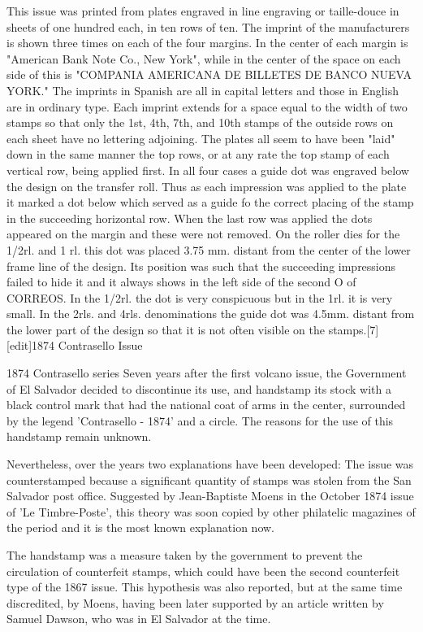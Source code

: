 This issue was printed from plates engraved in line engraving or taille-douce in sheets of one hundred each, in ten rows of ten. The imprint of the manufacturers is shown three times on each of the four margins. In the center of each margin is "American Bank Note Co., New York", while in the center of the space on each side of this is "COMPANIA AMERICANA DE BILLETES DE BANCO NUEVA YORK." The imprints in Spanish are all in capital letters and those in English are in ordinary type. Each imprint extends for a space equal to the width of two stamps so that only the 1st, 4th, 7th, and 10th stamps of the outside rows on each sheet have no lettering adjoining. The plates all seem to have been "laid" down in the same manner the top rows, or at any rate the top stamp of each vertical row, being applied first. In all four cases a guide dot was engraved below the design on the transfer roll. Thus as each impression was applied to the plate it marked a dot below which served as a guide fo the correct placing of the stamp in the succeeding horizontal row. When the last row was applied the dots appeared on the margin and these were not removed. On the roller dies for the 1/2rl. and 1 rl. this dot was placed 3.75 mm. distant from the center of the lower frame line of the design. Its position was such that the succeeding impressions failed to hide it and it always shows in the left side of the second O of CORREOS. In the 1/2rl. the dot is very conspicuous but in the 1rl. it is very small. In the 2rls. and 4rls. denominations the guide dot was 4.5mm. distant from the lower part of the design so that it is not often visible on the stamps.[7]
[edit]1874 Contrasello Issue



1874 Contrasello series
Seven years after the first volcano issue, the Government of El Salvador decided to discontinue its use, and handstamp its stock with a black control mark that had the national coat of arms in the center, surrounded by the legend 'Contrasello - 1874' and a circle. The reasons for the use of this handstamp remain unknown. 

Nevertheless, over the years two explanations have been developed:
The issue was counterstamped because a significant quantity of stamps was stolen from the San Salvador post office. Suggested by Jean-Baptiste Moens in the October 1874 issue of 'Le Timbre-Poste', this theory was soon copied by other philatelic magazines of the period and it is the most known explanation now.

The handstamp was a measure taken by the government to prevent the circulation of counterfeit stamps, which could have been the second counterfeit type of the 1867 issue. This hypothesis was also reported, but at the same time discredited, by Moens, having been later supported by an article written by Samuel Dawson, who was in El Salvador at the time.

